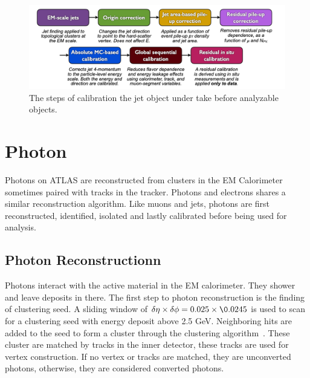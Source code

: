\begin{figure}[!htb]
    \begin{center}
        \includegraphics[width=1.1\textwidth]{figures/common_ana/JetCalibration}
        \caption{        
            The steps of calibration the jet object under take before analyzable objects\cite{Mehlhase:2770815}.
        }
        \label{fig:isolationWP}
    \end{center}
\end{figure}

\section{Photon}
\label{sec:Photon}
Photons on ATLAS are reconstructed from clusters in the EM Calorimeter sometimes paired with tracks in the tracker. Photons and electrons shares a similar reconstruction algorithm. Like muons and jets, photons are first reconstructed, identified, isolated and lastly calibrated before being used for analysis. 

\subsection{Photon Reconstructionn}
Photons interact with the active material in the EM calorimeter. They shower and leave deposits in there. The first step to photon reconstruction is the finding of clustering seed. A sliding window of $\delta \eta \times \delta \phi = 0.025 \times \0.0245$ is used to scan for a clustering seed with energy deposit above 2.5 GeV. Neighboring hits are added to the seed to form a cluster through the clustering algorithm~\cite{Lampl:1099735}. 
These cluster are matched by tracks in the inner detector, these tracks are used for vertex construction. If no vertex or tracks are matched, they are unconverted photons, otherwise, they are considered converted photons. 


